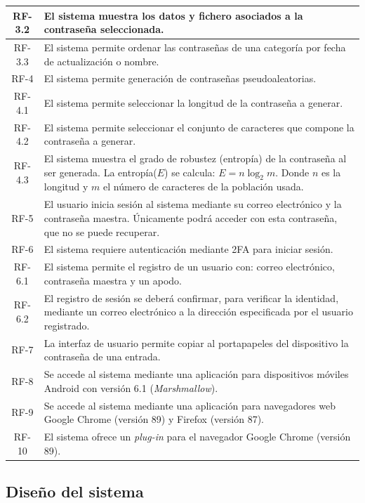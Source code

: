 \documentclass{article}
\begin{document}
\begin{table}[H]
\begin{tabular}{| c | p{30em} |}
       RF-3.2 & El sistema muestra los datos y fichero asociados a la contraseña seleccionada. \\ \hline
       RF-3.3 & El sistema permite ordenar las contraseñas de una categoría por fecha de actualización o nombre. \\ \hline
       RF-4 & El sistema permite generación de contraseñas pseudoaleatorias. \\ \hline
       RF-4.1 & El sistema permite seleccionar la longitud de la contraseña a generar.\\ \hline
       RF-4.2 & El sistema permite seleccionar el conjunto de caracteres que compone la contraseña a generar.\\ \hline
       RF-4.3 & El sistema muestra el grado de robustez (entropía) de la contraseña al ser generada. La entropía($E$) se calcula: $E=n\log_2m$. Donde $n$ es la longitud y $m$ el número de caracteres de la población usada.\\ \hline
       RF-5 & El usuario inicia sesión al sistema mediante su correo electrónico y la contraseña maestra. Únicamente podrá acceder con esta contraseña, que no se puede recuperar.\\ \hline
       RF-6 & El sistema requiere autenticación mediante 2FA para iniciar sesión. \\ \hline
       RF-6.1 & El sistema permite el registro de un usuario con: correo electrónico, contraseña maestra y un apodo.\\ \hline
       RF-6.2 & El registro de sesión se deberá confirmar, para verificar la identidad, mediante un correo electrónico a la dirección especificada por el usuario registrado. \\ \hline
       RF-7 & La interfaz de usuario permite copiar al portapapeles del dispositivo la contraseña de una entrada. \\ \hline
       RF-8 & Se accede al sistema mediante una aplicación para dispositivos móviles Android con versión 6.1 (\textit{Marshmallow}). \\ \hline
       RF-9 & Se accede al sistema mediante una aplicación para navegadores web Google Chrome (versión 89) y Firefox (versión 87). \\ \hline
       RF-10 & El sistema ofrece un \textit{plug-in} para el navegador Google Chrome (versión 89). \\ \hline
   \end{tabular}
\end{table}
 
\subsection{Diseño del sistema}
 
\end{document}
